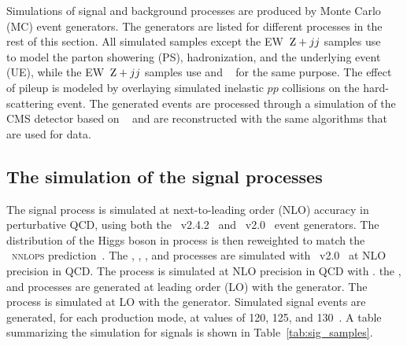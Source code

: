 Simulations of signal and background processes are produced by Monte Carlo (MC) event generators.
The generators are listed for different processes in the rest of this section.
All simulated samples except the EW~$\mathrm{Z}+jj$ samples use ~\cite{SJOSTRAND2015159} to model the parton showering (PS), 
hadronization, and the underlying event (UE), while the EW~$\mathrm{Z}+jj$ samples use \HERWIGpp and \HERWIGSeven~\cite{Bellm:2015jjp} for the same purpose.
The effect of pileup is modeled by overlaying simulated inelastic $pp$ collisions on the hard-scattering event.
The generated events are processed through a simulation of the CMS detector based on \GEANTfour~\cite{AGOSTINELLI2003250}
and are reconstructed with the same algorithms that are used for data.

\bigskip
\subsection{The simulation of the signal processes}
The \ggH signal process is simulated at next-to-leading order (NLO) accuracy in perturbative QCD, using both the \MGvATNLO~v2.4.2~\cite{Alwall:2014hca}
and \POWHEG~v2.0~\cite{Nason_2004, Frixione_2007, Alioli:2010xd, Bagnaschi:2011tu} event generators. 
The \pt distribution of the Higgs boson in \ggH process is then reweighted to match the \POWHEG~\textsc{nnlops} prediction~\cite{Hamilton:2013fea,Hamilton:2015nsa}. 
The \qqH, \WH, \qqZH, and \ttH processes are simulated with \POWHEG~v2.0~\cite{Nason:2009ai,Luisoni:2013kna,Hartanto:2015uka} at NLO precision in QCD. 
The \bbH process is simulated at NLO precision in QCD with \POWHEG.
the \tHq, and \tHW processes are generated at leading order (LO) with the \MGvATNLO generator.
The \ggZH process is simulated at LO with the \POWHEG generator.
Simulated signal events are generated, for each production mode, at \mh values of 120, 125, and 130~\GeV.
A table summarizing the simulation for signals is shown in Table~\ref{tab:sig_samples}.


